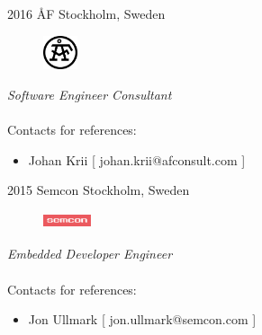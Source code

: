 \documentclass[]{friggeri-cv} %
\begin{document}
\begin{entrylist}
\entry
{2016}
{ÅF}
{Stockholm, Sweden}
{
\begin{figure}
	\vspace{-20pt}
	\begin{center}
		\includegraphics[width=1cm,height=1cm]{af}
	\end{center}
\end{figure}
\emph{Software Engineer Consultant} \\

\\Contacts for references: 
\begin{itemize}
	\item Johan Krii [ johan.krii@afconsult.com ]
\end{itemize}
}
\end{entrylist}


\begin{entrylist}
\entry
{2015}
{Semcon}
{Stockholm, Sweden}
{
\begin{figure}
	\vspace{-20pt}
	\begin{center}
		\includegraphics[width=1.4cm,height=0.5cm]{semcon}
	\end{center}
\end{figure}
\emph{Embedded Developer Engineer} \\
\\Contacts for references: 
\begin{itemize}
	\item Jon Ullmark [ jon.ullmark@semcon.com ]
\end{itemize}
}
\end{entrylist}
\end{document}
